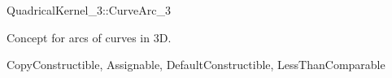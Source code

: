 \begin{ccRefConcept}{QuadricalKernel_3::CurveArc_3}

Concept for arcs of curves in 3D.

\ccRefines
CopyConstructible, Assignable, DefaultConstructible, LessThanComparable


\ccSeeAlso


\end{ccRefConcept}
